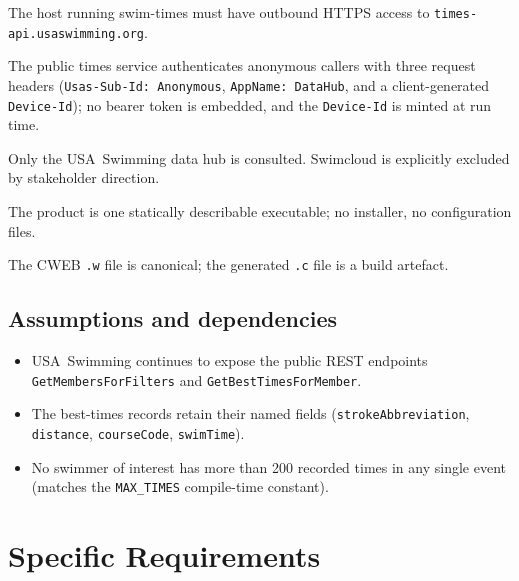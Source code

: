 \documentclass[12pt]{article}
\newcommand{\code}[1]{\texttt{#1}}
\begin{document}
\begin{description}[style=nextline]
  \item[Network.]
        The host running swim-times must have outbound HTTPS access
        to \texttt{times-api.usaswimming.org}.
  \item[Authentication.]
        The public times service authenticates anonymous callers
        with three request headers (\code{Usas-Sub-Id: Anonymous},
        \code{AppName: DataHub}, and a client-generated
        \code{Device-Id}); no bearer token is embedded, and the
        \code{Device-Id} is minted at run time.
  \item[Data source exclusivity.]
        Only the USA~Swimming data hub is consulted.
        Swimcloud is explicitly excluded by stakeholder direction.
  \item[Single-binary distribution.]
        The product is one statically describable executable;
        no installer, no configuration files.
  \item[Literate source of record.]
        The CWEB \code{.w} file is canonical; the generated
        \code{.c} file is a build artefact.
\end{description}

\subsection{Assumptions and dependencies}

\begin{itemize}
  \item USA~Swimming continues to expose the public REST endpoints
        \code{GetMembersForFilters} and
        \code{GetBestTimesForMember}.
  \item The best-times records retain their named fields
        (\code{strokeAbbreviation}, \code{distance},
        \code{courseCode}, \code{swimTime}).
  \item No swimmer of interest has more than 200 recorded times in
        any single event (matches the \code{MAX\_TIMES} compile-time
        constant).
\end{itemize}

\section{Specific Requirements}
\end{document}

